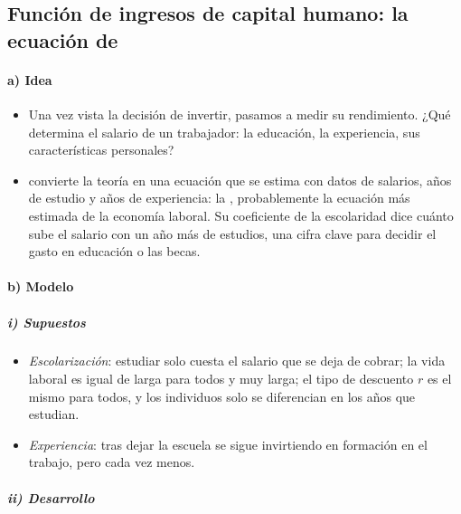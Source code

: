 \documentclass[11pt]{article}
\begin{document}
\subsection{Función de ingresos de capital humano:\cortetitulo{} la ecuación de }\label{sec:mincer}

\paragraph{a) Idea}

\begin{itemize}
\item Una vez vista la decisión de invertir, pasamos a medir su rendimiento. ¿Qué determina el salario de un trabajador: la educación, la experiencia, sus características personales?
\item \textcite{Mincer1974Schooling} convierte la teoría en una ecuación que se estima con datos de salarios, años de estudio y años de experiencia: la , probablemente la ecuación más estimada de la economía laboral. Su coeficiente de la escolaridad dice cuánto sube el salario con un año más de estudios, una cifra clave para decidir el gasto en educación o las becas.
\end{itemize}

\paragraph{b) Modelo}\label{sec:mincer-modelo}

\subparagraph{i) Supuestos}

\begin{itemize}
\item \emph{Escolarización}\nocite{Mincer1958Investment}: estudiar solo cuesta el salario que se deja de cobrar; la vida laboral es igual de larga para todos y muy larga; el tipo de descuento $r$ es el mismo para todos, y los individuos solo se diferencian en los años que estudian.
\item \emph{Experiencia}: tras dejar la escuela se sigue invirtiendo en formación en el trabajo, pero cada vez menos.
\end{itemize}

\subparagraph{ii) Desarrollo}
\end{document}
